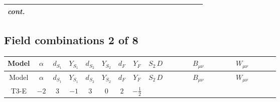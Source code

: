 \documentclass[8pt]{article}
\begin{document}
\begin{landscape}
\begin{longtable}{@{}cccccccc >{\raggedright\arraybackslash}p{0.21\linewidth} >{\raggedright\arraybackslash}p{0.21\linewidth} >{\raggedright\arraybackslash}p{0.21\linewidth}@{}}
\textit{cont.} &  &  &  &  &  &  &  & \scriptsize\adjustbox{max width=\linewidth}{$\begin{gathered} -\frac{2 \hbar  \overline{y_{1,i_1,r_1}} S_{1,j_3} S_{1,j_4} y_{1,i_1,r_1} S_{1,j_1}{}^{\dagger } S_{1,j_2}{}^{\dagger } \mathcal{I}_{S_1,j_1,j_3,j_2,j_4}{}^2 \lambda_{S_1}^{(1)}^{(2)}}{\sqrt{3} \epsilon } \\ -\frac{\hbar  \overline{y_{1,i_1,r_1}} S_{1,j_3} S_{1,j_4} y_{1,i_1,r_1} S_{1,j_1}{}^{\dagger } S_{1,j_2}{}^{\dagger } \mathcal{I}_{S_1,j_1,j_3,j_2,j_4}{}^2 \lambda_{S_1}^{(1)}^{(2)}}{\sqrt{3}}\end{gathered}$} &  & \scriptsize\adjustbox{max width=\linewidth}{$\begin{gathered} -\frac{2 \hbar  \overline{y_{2,i_1,r_1}} S_{2,j_3} S_{2,j_4} y_{2,i_1,r_1} S_{2,j_1}{}^{\dagger } S_{2,j_2}{}^{\dagger } \mathcal{I}_{S_2,j_1,j_3,j_2,j_4}{}^2 \lambda_{S_2}^{(1)}^{(2)}}{\sqrt{3} \epsilon } \\ -\frac{\hbar  \overline{y_{2,i_1,r_1}} S_{2,j_3} S_{2,j_4} y_{2,i_1,r_1} S_{2,j_1}{}^{\dagger } S_{2,j_2}{}^{\dagger } \mathcal{I}_{S_2,j_1,j_3,j_2,j_4}{}^2 \lambda_{S_2}^{(1)}^{(2)}}{\sqrt{3}}\end{gathered}$} \\
\midrule
\bottomrule
\end{longtable}
\clearpage
\subsection*{Field combinations 2 of 8}
\begin{longtable}{@{}cccccccc >{\raggedright\arraybackslash}p{0.21\linewidth} >{\raggedright\arraybackslash}p{0.21\linewidth} >{\raggedright\arraybackslash}p{0.21\linewidth}@{}}
\toprule
Model & $\alpha$ & $d_{S_1}$ & $Y_{S_1}$ & $d_{S_2}$ & $Y_{S_2}$ & $d_F$ & $Y_F$ & $S_2\,D$ & $B_{\mu\nu}$ & $W_{\mu\nu}$ \\
\midrule
\endfirsthead
\toprule
Model & $\alpha$ & $d_{S_1}$ & $Y_{S_1}$ & $d_{S_2}$ & $Y_{S_2}$ & $d_F$ & $Y_F$ & $S_2\,D$ & $B_{\mu\nu}$ & $W_{\mu\nu}$ \\
\midrule
\endhead
T3-E & $-2$ & $3$ & $-1$ & $3$ & $0$ & $2$ & $-\frac{1}{2}$ & \scriptsize\adjustbox{max width=\linewidth}{$\begin{gathered} +D_{\mu _1}\left(S_{2,j_1}\right){}^{\dagger } D_{\mu _1}\left(S_{2,j_1}\right)\end{gathered}$} & \scriptsize\adjustbox{max width=\linewidth}{$\begin{gathered} -\frac{\hbar  B_{\mu _1\mu _2}^2}{2 \epsilon }\end{gathered}$} & \scriptsize\adjustbox{max width=\linewidth}{$\begin{gathered} -\frac{\hbar  \left(W_{\mu _1\mu _2}^{A_1}\right){}^2}{2 \epsilon }\end{gathered}$} \\
\midrule
\bottomrule
\end{longtable}
\clearpage

\end{landscape}
\end{document}
